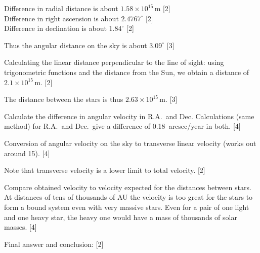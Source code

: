 
Difference in radial distance is about $1.58 \times 10^{15}$\,m
\hfill[2]\\
Difference in right ascension is about $2.4767^\circ$ \hfill[2]\\
Difference in declination is about $1.84^\circ$ \hfill[2]

Thus the angular distance on the sky is about $3.09^\circ$ \hfill[3]

Calculating the linear distance perpendicular to the line of sight:
using trigonometric functions and the distance from the Sun, we obtain a
distance of $2.1 \times 10^{15}$\,m. \hfill[2]

The distance between the stars is thus $2.63 \times 10^{15}$\,m. \hfill[3]

Calculate the difference in angular velocity in R.A.\ and Dec. Calculations
(same method) for R.A.\ and Dec.\ give a difference of 0.18\ arcsec/year in
both. \hfill[4]

Conversion of angular velocity on the sky to transverse linear velocity
(works out around 15). \hfill[4]

Note that transverse velocity is a lower limit to total velocity. \hfill[2]

Compare obtained velocity to velocity expected for the distances between
stars. At distances of tens of thousands of AU the velocity is too great for
the stars to form a bound system even with very massive stars. Even for a
pair of one light and one heavy star, the heavy one would have a mass of
thousands of solar masses. \hfill[4]

Final answer and conclusion: \hfill[2]
